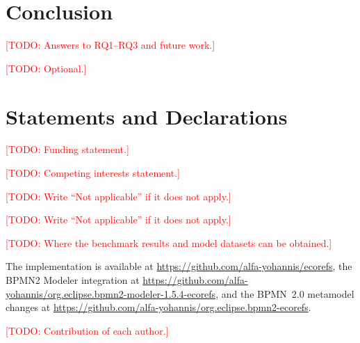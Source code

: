 \documentclass[iicol,pdflatex,sn-mathphys-num]{sn-jnl}
\theoremstyle{thmstylethree}%
\newcommand{\todo}[1]{\textcolor{red}{[TODO: #1]}}
\begin{document}
\section{Conclusion}\label{sec:conclusion}

\todo{Answers to RQ1--RQ3 and future work.}

\backmatter


\todo{Optional.}

\section*{Statements and Declarations}

\todo{Funding statement.}

\todo{Competing interests statement.}

\todo{Write ``Not applicable'' if it does not apply.}

\todo{Write ``Not applicable'' if it does not apply.}

\todo{Where the benchmark results and model datasets can be obtained.}

The implementation is available at
\url{https://github.com/alfa-yohannis/ecorefs}, the BPMN2 Modeler integration at
\url{https://github.com/alfa-yohannis/org.eclipse.bpmn2-modeler-1.5.4-ecorefs},
and the BPMN~2.0 metamodel changes at
\url{https://github.com/alfa-yohannis/org.eclipse.bpmn2-ecorefs}.

\todo{Contribution of each author.}


\end{document}
